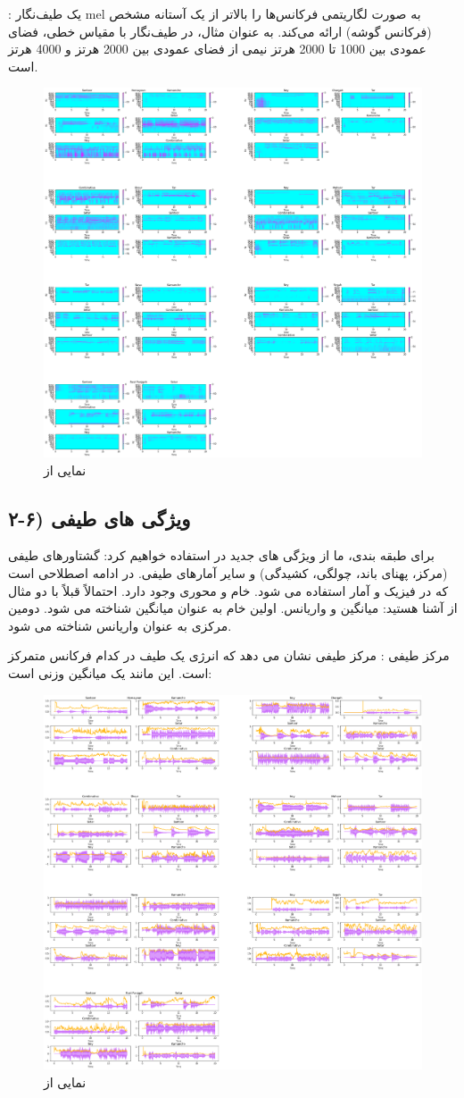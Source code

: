 \documentclass{article}
\begin{document}
 : \newline
یک طیف‌نگار mel به صورت لگاریتمی فرکانس‌ها را بالاتر از یک آستانه مشخص (فرکانس گوشه) ارائه می‌کند. به عنوان مثال، در طیف‌نگار با مقیاس خطی، فضای عمودی بین 1000 تا 2000 هرتز نیمی از فضای عمودی بین 2000 هرتز و 4000 هرتز است.
\begin{figure}[h]
	\centering
	\includegraphics[width=0.5\linewidth]{Photo/33}
	\caption[نمایی از ]{نمایی از }
	\label{fig:33}
\end{figure}

\newpage
\subsection{۲-۶) ویژگی های طیفی}

برای طبقه بندی، ما از ویژگی های جدید در استفاده خواهیم کرد: گشتاورهای طیفی (مرکز، پهنای باند، چولگی، کشیدگی) و سایر آمارهای طیفی.
\newline
در ادامه  اصطلاحی است که در فیزیک و آمار استفاده می شود.  خام و  محوری وجود دارد.\newline
احتمالاً قبلاً با دو مثال از    آشنا هستید: میانگین و واریانس. اولین   خام به عنوان میانگین شناخته می شود. دومین   مرکزی به عنوان واریانس شناخته می شود.\newline


مرکز طیفی : مرکز طیفی نشان می دهد که انرژی یک طیف در کدام فرکانس متمرکز است. این مانند یک میانگین وزنی است:
\begin{figure}[h]
	\centering
	\includegraphics[width=0.5\linewidth]{Photo/29}
	\caption[نمایی از ]{نمایی از }
	\label{fig:29}
\end{figure}
\end{document}
